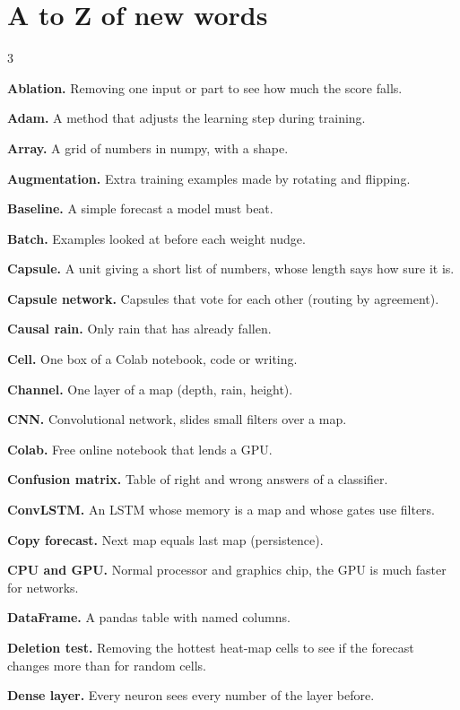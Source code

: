 \section{A to Z of new words}\label{ch:gloss}
\begin{multicols}{3}
\scriptsize
\setlength{\parskip}{0.05em}
\raggedright
\textbf{Ablation.} Removing one input or part to see how much the score falls.\par
\textbf{Adam.} A method that adjusts the learning step during training.\par
\textbf{Array.} A grid of numbers in numpy, with a shape.\par
\textbf{Augmentation.} Extra training examples made by rotating and flipping.\par
\textbf{Baseline.} A simple forecast a model must beat.\par
\textbf{Batch.} Examples looked at before each weight nudge.\par
\textbf{Capsule.} A unit giving a short list of numbers, whose length says how sure it is.\par
\textbf{Capsule network.} Capsules that vote for each other (routing by agreement).\par
\textbf{Causal rain.} Only rain that has already fallen.\par
\textbf{Cell.} One box of a Colab notebook, code or writing.\par
\textbf{Channel.} One layer of a map (depth, rain, height).\par
\textbf{CNN.} Convolutional network, slides small filters over a map.\par
\textbf{Colab.} Free online notebook that lends a GPU.\par
\textbf{Confusion matrix.} Table of right and wrong answers of a classifier.\par
\textbf{ConvLSTM.} An LSTM whose memory is a map and whose gates use filters.\par
\textbf{Copy forecast.} Next map equals last map (persistence).\par
\textbf{CPU and GPU.} Normal processor and graphics chip, the GPU is much faster for networks.\par
\textbf{DataFrame.} A pandas table with named columns.\par
\textbf{Deletion test.} Removing the hottest heat-map cells to see if the forecast changes more than for random cells.\par
\textbf{Dense layer.} Every neuron sees every number of the layer before.\par

\end{multicols}
